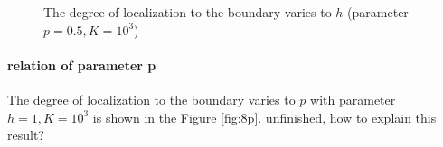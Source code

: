 \documentclass[12pt,a4paper]{article}
\begin{document}
\begin{figure}[h]
\centering
{}
\caption{The degree of localization to the boundary varies to $h$ (parameter $p=0.5, K=10^3$)}
\label{fig:8h}
\end{figure}


\paragraph{relation of parameter p}

The degree of localization to the boundary varies to $p$ with parameter $h=1, K=10^3$ is shown in the Figure \ref{fig:8p}. {\color{red} unfinished, how to explain this result?}
\end{document}
